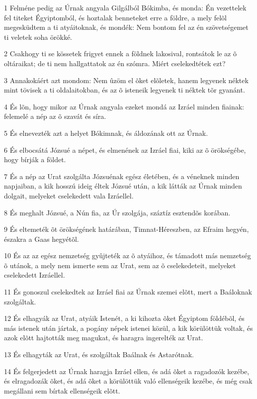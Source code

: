 \par 1 Felméne pedig az Úrnak angyala Gilgálból Bókimba, és monda: Én vezettelek fel titeket Égyiptomból, és hoztalak benneteket erre a földre, a mely felõl megesküdtem a ti atyáitoknak, és mondék: Nem bontom fel az én szövetségemet ti veletek soha örökké.
\par 2 Csakhogy ti se kössetek frigyet ennek a földnek lakosival, rontsátok le az õ oltáraikat;  de ti nem hallgattatok az én szómra. Miért cselekedtétek ezt?
\par 3 Annakokáért azt mondom: Nem ûzöm el õket elõletek, hanem legyenek néktek mint tövisek a ti oldalaitokban, és az õ isteneik legyenek ti néktek tõr gyanánt.
\par 4 És lõn, hogy mikor az Úrnak angyala ezeket mondá az Izráel minden fiainak: felemelé a nép az õ szavát és síra.
\par 5 És elnevezték azt a helyet Bókimnak, és áldozának ott az Úrnak.
\par 6 És elbocsátá Józsué a népet, és elmenének az Izráel fiai, kiki az õ örökségébe, hogy bírják a földet.
\par 7 És a nép az Urat szolgálta Józsuénak egész életében, és a véneknek minden napjaiban, a kik hosszú ideig éltek Józsué után, a kik látták az Úrnak minden dolgait, melyeket cselekedett vala Izráellel.
\par 8 És meghalt Józsué, a Nún fia, az Úr szolgája, száztíz esztendõs korában.
\par 9 És eltemeték õt örökségének határában, Timnat-Héreszben, az Efraim hegyén, északra a Gaas hegyétõl.
\par 10 És az az egész nemzetség gyûjteték az õ atyáihoz, és támadott más nemzetség õ utánok, a mely nem ismerte sem az Urat, sem az õ cselekedeteit, melyeket cselekedett Izráellel.
\par 11 És gonoszul cselekedtek az Izráel fiai az Úrnak szemei elõtt, mert a Baáloknak szolgáltak.
\par 12 És elhagyák az Urat, atyáik Istenét, a ki kihozta õket Égyiptom földébõl, és más istenek után jártak, a pogány népek istenei közül, a kik körülöttük voltak, és azok elõtt hajtották meg magukat, és haragra ingerelték az Urat.
\par 13 És elhagyták az Urat, és szolgáltak Baálnak és Astarótnak.
\par 14 És felgerjedett az Úrnak haragja Izráel ellen, és adá õket a ragadozók kezébe, és elragadozák õket, és adá õket a körülöttük való ellenségeik kezébe, és még csak megállani sem bírtak ellenségeik elõtt.
